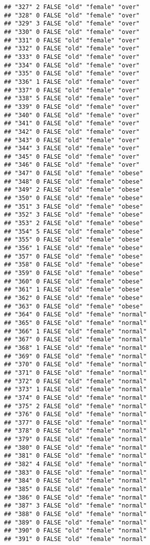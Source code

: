 \documentclass[]{article}
\begin{document}
\begin{verbatim}
## "327" 2 FALSE "old" "female" "over"
## "328" 0 FALSE "old" "female" "over"
## "329" 3 FALSE "old" "female" "over"
## "330" 0 FALSE "old" "female" "over"
## "331" 0 FALSE "old" "female" "over"
## "332" 0 FALSE "old" "female" "over"
## "333" 0 FALSE "old" "female" "over"
## "334" 0 FALSE "old" "female" "over"
## "335" 0 FALSE "old" "female" "over"
## "336" 1 FALSE "old" "female" "over"
## "337" 0 FALSE "old" "female" "over"
## "338" 5 FALSE "old" "female" "over"
## "339" 0 FALSE "old" "female" "over"
## "340" 0 FALSE "old" "female" "over"
## "341" 0 FALSE "old" "female" "over"
## "342" 0 FALSE "old" "female" "over"
## "343" 0 FALSE "old" "female" "over"
## "344" 3 FALSE "old" "female" "over"
## "345" 0 FALSE "old" "female" "over"
## "346" 0 FALSE "old" "female" "over"
## "347" 0 FALSE "old" "female" "obese"
## "348" 0 FALSE "old" "female" "obese"
## "349" 2 FALSE "old" "female" "obese"
## "350" 0 FALSE "old" "female" "obese"
## "351" 3 FALSE "old" "female" "obese"
## "352" 3 FALSE "old" "female" "obese"
## "353" 2 FALSE "old" "female" "obese"
## "354" 5 FALSE "old" "female" "obese"
## "355" 0 FALSE "old" "female" "obese"
## "356" 1 FALSE "old" "female" "obese"
## "357" 0 FALSE "old" "female" "obese"
## "358" 0 FALSE "old" "female" "obese"
## "359" 0 FALSE "old" "female" "obese"
## "360" 0 FALSE "old" "female" "obese"
## "361" 1 FALSE "old" "female" "obese"
## "362" 0 FALSE "old" "female" "obese"
## "363" 0 FALSE "old" "female" "obese"
## "364" 0 FALSE "old" "female" "normal"
## "365" 0 FALSE "old" "female" "normal"
## "366" 1 FALSE "old" "female" "normal"
## "367" 0 FALSE "old" "female" "normal"
## "368" 1 FALSE "old" "female" "normal"
## "369" 0 FALSE "old" "female" "normal"
## "370" 0 FALSE "old" "female" "normal"
## "371" 0 FALSE "old" "female" "normal"
## "372" 0 FALSE "old" "female" "normal"
## "373" 1 FALSE "old" "female" "normal"
## "374" 0 FALSE "old" "female" "normal"
## "375" 2 FALSE "old" "female" "normal"
## "376" 0 FALSE "old" "female" "normal"
## "377" 0 FALSE "old" "female" "normal"
## "378" 0 FALSE "old" "female" "normal"
## "379" 0 FALSE "old" "female" "normal"
## "380" 0 FALSE "old" "female" "normal"
## "381" 0 FALSE "old" "female" "normal"
## "382" 4 FALSE "old" "female" "normal"
## "383" 0 FALSE "old" "female" "normal"
## "384" 0 FALSE "old" "female" "normal"
## "385" 0 FALSE "old" "female" "normal"
## "386" 0 FALSE "old" "female" "normal"
## "387" 3 FALSE "old" "female" "normal"
## "388" 0 FALSE "old" "female" "normal"
## "389" 0 FALSE "old" "female" "normal"
## "390" 0 FALSE "old" "female" "normal"
## "391" 0 FALSE "old" "female" "normal"

\end{verbatim}
\end{document}
